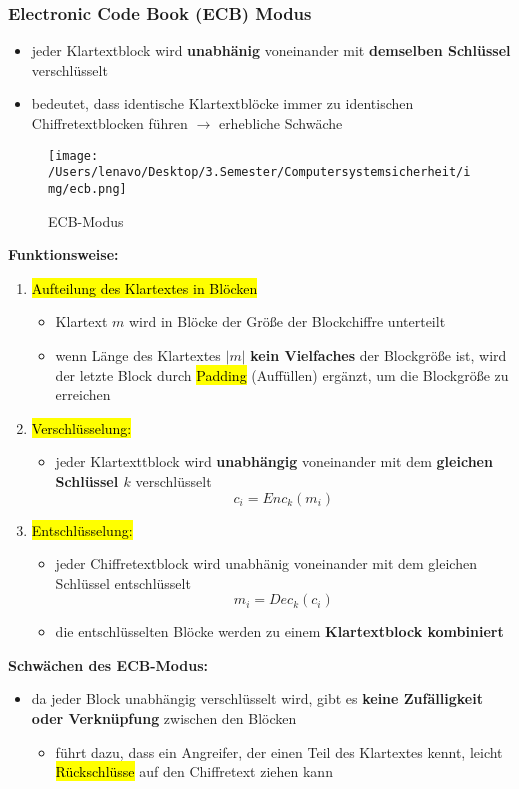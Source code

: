 \documentclass[a4paper, 10pt]{article}
\begin{document}
\subsubsection{Electronic Code Book (ECB) Modus}
\begin{itemize}
    \item jeder Klartextblock wird \textbf{unabhänig} voneinander mit \textbf{demselben Schlüssel} verschlüsselt
    \item bedeutet, dass identische Klartextblöcke immer zu identischen Chiffretextblocken führen $\rightarrow$ erhebliche Schwäche
\end{itemize}
\begin{figure}[h]
    \centering
    \texttt{[image: /Users/lenavo/Desktop/3.Semester/Computersystemsicherheit/img/ecb.png]}
    \caption{ECB-Modus}
    \label{fig:enter-label}
\end{figure}
\textbf{Funktionsweise:}
\begin{enumerate}
    \item \hl{Aufteilung des Klartextes in Blöcken}
    \begin{itemize}
        \item Klartext $m$ wird in Blöcke der Größe der Blockchiffre unterteilt
        \item wenn Länge des Klartextes $|m|$ \textbf{kein Vielfaches} der Blockgröße ist, wird der letzte Block durch \hl{Padding} (Auffüllen) ergänzt, um die Blockgröße zu erreichen
    \end{itemize}

    \item \hl{Verschlüsselung:}
    \begin{itemize}
        \item jeder Klartexttblock wird \textbf{unabhängig} voneinander mit dem \textbf{gleichen Schlüssel $k$} verschlüsselt
        \[
            c_i = Enc_k (m_i)
        \]
    \end{itemize}

    \item \hl{Entschlüsselung:}
    \begin{itemize}
        \item jeder Chiffretextblock wird unabhänig voneinander mit dem gleichen Schlüssel entschlüsselt
        \[
            m_i = Dec_k(c_i)
        \]
        \item die entschlüsselten Blöcke werden zu einem \textbf{Klartextblock kombiniert}
    \end{itemize}
\end{enumerate}
\textbf{Schwächen des ECB-Modus:}
\begin{itemize}
    \item da jeder Block unabhängig verschlüsselt wird, gibt es \textbf{keine Zufälligkeit oder Verknüpfung} zwischen den Blöcken
    \begin{itemize}
        \item führt dazu, dass ein Angreifer, der einen Teil des Klartextes kennt, leicht \hl{Rückschlüsse} auf den Chiffretext ziehen kann 
    \end{itemize}
\end{itemize}
\end{document}

